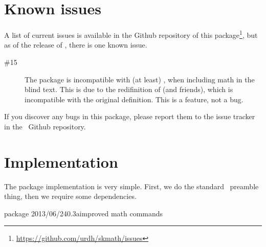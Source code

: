 \documentclass[commonsets,load]{skdoc}
\begin{document}
  \section{Known issues}
  A list of current issues is available in the Github repository of this
  package\footnote{\url{https://github.com/urdh/skmath/issues}}, but as
  of the release of \theversion, there is one known issue.
  \begin{description}
      \item[\#15] The package is incompatible with (at least)
        , when including math in the blind text. This
        is due to the redifinition of  (and friends), which
        is incompatible with the original  definition.
        This is a feature, not a bug.
  \end{description}

  If you discover any bugs in this package, please report them to the issue
  tracker in the \thepackage\ Github repository.

  \Implementation\ExplHack
  \section{Implementation}
  The package implementation is very simple. First, we do the standard
  \LaTeXe\ preamble thing, then we require some dependencies.
\begin{MacroCode}{package}
\RequirePackage{expl3,l3keys2e,xparse}
    {2013/06/24}{0.3a}{improved math commands}
\RequirePackage{amssymb,mathtools,xfrac,isomath}
\end{MacroCode}
\end{document}
